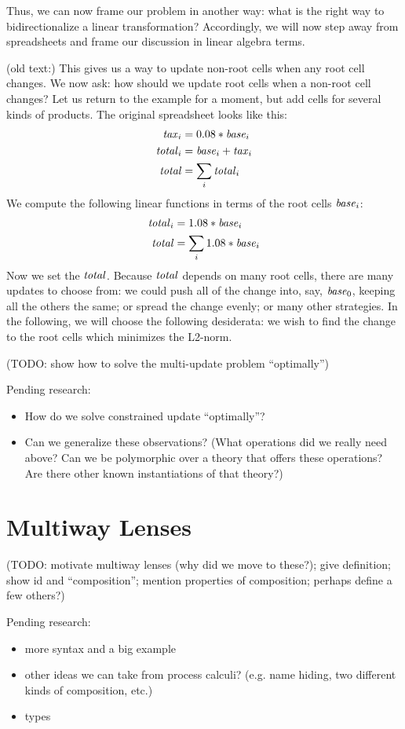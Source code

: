\documentclass{article}
\begin{document}
Thus, we can now frame our problem in another way: what is the right way to
bidirectionalize a linear transformation? Accordingly, we will now step away
from spreadsheets and frame our discussion in linear algebra terms.

(old text:)
This gives us a way to update non-root cells when any root cell changes. We
now ask: how should we update root cells when a non-root cell changes? Let
us return to the example for a moment, but add cells for several kinds of
products.  The original spreadsheet looks like this:
\begin{align*}
    \mathit{tax}_i &= 0.08*\mathit{base}_i \\
    \mathit{total}_i &= \mathit{base}_i+\mathit{tax}_i \\
    \mathit{total} &= \sum_{i}\mathit{total}_i
\end{align*}
We compute the following linear functions in terms of the root cells
$\mathit{base}_i$:
\begin{align*}
    \mathit{total}_i &= 1.08*\mathit{base}_i \\
    \mathit{total} &= \sum_i 1.08*\mathit{base}_i
\end{align*}
Now we set the $\mathit{total}$. Because $\mathit{total}$ depends on many root cells, there
are many updates to choose from: we could push all of the change into, say,
$\mathit{base}_0$, keeping all the others the same; or spread the change evenly; or
many other strategies. In the following, we will choose the following
desiderata: we wish to find the change to the root cells which minimizes the
L2-norm.

(TODO: show how to solve the multi-update problem ``optimally'')

Pending research:
\begin{itemize}
    \item How do we solve constrained update ``optimally''?
    \item Can we generalize these observations? (What operations did we
        really need above? Can we be polymorphic over a theory that offers
        these operations? Are there other known instantiations of that
        theory?)
\end{itemize}
\section{Multiway Lenses}
(TODO: motivate multiway lenses (why did we move to these?); give
definition; show id and ``composition''; mention properties of composition;
perhaps define a few others?)

Pending research:
\begin{itemize}
    \item more syntax and a big example
    \item other ideas we can take from process calculi? (e.g. name hiding,
        two different kinds of composition, etc.)
    \item types
\end{itemize}
\end{document}
